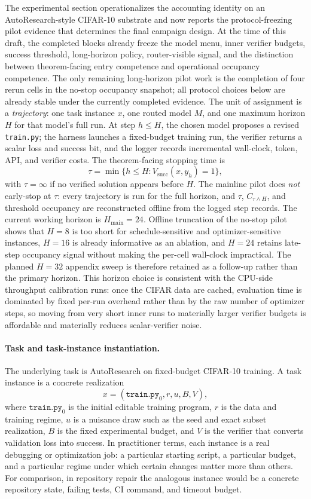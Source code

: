 \documentclass{article}
\begin{document}
The experimental section operationalizes the accounting identity on an AutoResearch-style CIFAR-10 substrate and now reports the protocol-freezing pilot evidence that determines the final campaign design.
At the time of this draft, the completed blocks already freeze the model menu, inner verifier budgets, success threshold, long-horizon policy, router-visible signal, and the distinction between theorem-facing entry competence and operational occupancy competence.
The only remaining long-horizon pilot work is the completion of four rerun cells in the no-stop occupancy snapshot; all protocol choices below are already stable under the currently completed evidence.
The unit of assignment is a \emph{trajectory}: one task instance $x$, one routed model $M$, and one maximum horizon $H$ for that model's full run.
At step $h\le H$, the chosen model proposes a revised \texttt{train.py}; the harness launches a fixed-budget training run, the verifier returns a scalar loss and success bit, and the logger records incremental wall-clock, token, API, and verifier costs.
The theorem-facing stopping time is
\[
  \tau=\min\{h\le H:V_{\mathrm{succ}}(x,y_h)=1\},
\]
with $\tau=\infty$ if no verified solution appears before $H$.
The mainline pilot does \emph{not} early-stop at $\tau$: every trajectory is run for the full horizon, and $\tau$, $C_{\tau\wedge H}$, and threshold occupancy are reconstructed offline from the logged step records.
The current working horizon is $H_{\mathrm{main}}=24$.
Offline truncation of the no-stop pilot shows that $H=8$ is too short for schedule-sensitive and optimizer-sensitive instances, $H=16$ is already informative as an ablation, and $H=24$ retains late-step occupancy signal without making the per-cell wall-clock impractical.
The planned $H=32$ appendix sweep is therefore retained as a follow-up rather than the primary horizon.
This horizon choice is consistent with the CPU-side throughput calibration runs: once the CIFAR data are cached, evaluation time is dominated by fixed per-run overhead rather than by the raw number of optimizer steps, so moving from very short inner runs to materially larger verifier budgets is affordable and materially reduces scalar-verifier noise.

\paragraph{Task and task-instance instantiation.}
The underlying task is AutoResearch on fixed-budget CIFAR-10 training.
A task instance is a concrete realization
\[
  x=(\texttt{train.py}_0, r, u, B, V),
\]
where $\texttt{train.py}_0$ is the initial editable training program, $r$ is the data and training regime, $u$ is a nuisance draw such as the seed and exact subset realization, $B$ is the fixed experimental budget, and $V$ is the verifier that converts validation loss into success.
In practitioner terms, each instance is a real debugging or optimization job: a particular starting script, a particular budget, and a particular regime under which certain changes matter more than others.
For comparison, in repository repair the analogous instance would be a concrete repository state, failing tests, CI command, and timeout budget.
\end{document}
